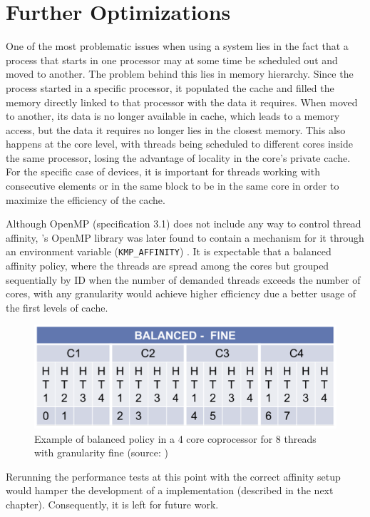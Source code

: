 \documentclass[../thesis]{subfiles}
\begin{document}
	\section{Further Optimizations}
	\label{sec:mic:further}

	One of the most problematic issues when using a \numa system lies in the fact that a process that starts in one processor may at some time be scheduled out and moved to another. The problem behind this lies in memory hierarchy. Since the process started in a specific processor, it populated the cache and filled the memory directly linked to that processor with the data it requires. When moved to another, its data is no longer available in cache, which leads to a memory access, but the data it requires no longer lies in the closest memory. This also happens at the core level, with threads being scheduled to different cores inside the same processor, losing the advantage of locality in the core's private cache. For the specific case of \intel\mic devices, it is important for threads working with consecutive elements or in the same block to be in the same core in order to maximize the efficiency of the cache.

	Although OpenMP (specification 3.1) does not include any way to control thread affinity, \intel's OpenMP library was later found to contain a mechanism for it through an environment variable (\texttt{KMP\_AFFINITY}) \cite{PRACE:MIC:BestPracticeGuide,CESGA:MIC:Evaluation}. It is expectable that a balanced affinity policy, where the threads are spread among the cores but grouped sequentially by ID when the number of demanded threads exceeds the number of cores, with any granularity would achieve higher efficiency due a better usage of the first levels of cache.

	\begin{figure}
		\begin{center}
			\includegraphics[width=\textwidth]{assets/images/kmp_affinity_balanced.png}
		\end{center}
		\caption{Example of balanced policy in a 4 core coprocessor for 8 threads with granularity fine (source: \cite{CESGA:MIC:Evaluation})}
		\label{fig:kmp_affinity:balanced}
	\end{figure}

	Rerunning the performance tests at this point with the correct affinity setup would hamper the development of a \cuda implementation (described in the next chapter). Consequently, it is left for future work.
\end{document}
